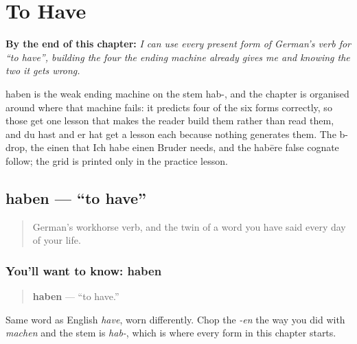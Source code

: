 
\chapter{To Have}
\label{ch:haben}

\begin{chapteropening}
\textbf{By the end of this chapter:} \emph{I can use every present form of German's verb for “to have”, building the four the ending machine already gives me and knowing the two it gets wrong.}

haben is the weak ending machine on the stem hab-, and the chapter is organised around where that machine fails: it predicts four of the six forms correctly, so those get one lesson that makes the reader build them rather than read them, and du hast and er hat get a lesson each because nothing generates them. The b-drop, the einen that Ich habe einen Bruder needs, and the habēre false cognate follow; the grid is printed only in the practice lesson.
\end{chapteropening}

\section[haben]{haben — \textquotedblleft{}to have\textquotedblright{}}

\label{lesson:GE-C14-haben}



\begin{quote}
German's workhorse verb, and the twin of a word you have said every day of your life.
\end{quote}

\subsection*{You'll want to know: haben}
\begin{quote}
\textbf{haben} — \textquotedblleft{}to have.\textquotedblright{}
\end{quote}

Same word as English \emph{have}, worn differently. Chop the \emph{-en} the way you did with \emph{machen} and the stem is \emph{hab-}, which is where every form in this chapter starts.

